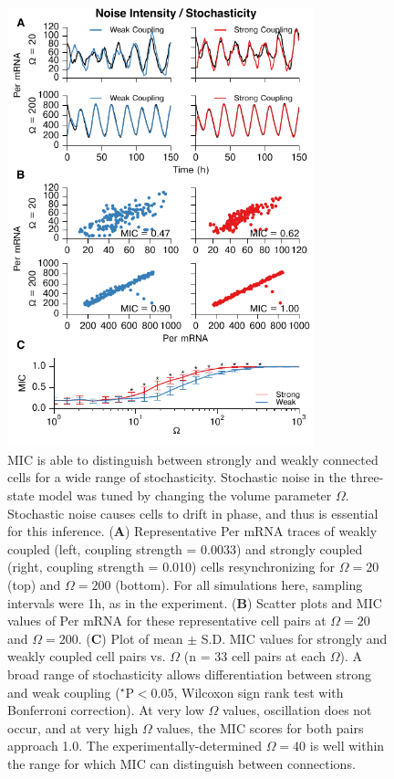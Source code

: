 \begin{figure}[p]
    \begin{center}
        \includegraphics[width=3.5in]{chap3/figures/s3.pdf}
    \end{center}
    \caption{\label{fig:s3} 
    MIC is able to distinguish between strongly and weakly connected cells for a wide range of stochasticity. Stochastic noise in the three-state model \cite{Schroder2012} was tuned by changing the volume parameter $\Omega$.
    Stochastic noise causes cells to drift in phase, and thus is essential for this inference.
    (\textbf{A}) Representative Per mRNA traces of weakly coupled (left, coupling strength = 0.0033) and strongly coupled (right, coupling strength = 0.010) cells resynchronizing for $\Omega=20$ (top) and $\Omega=200$ (bottom). For all simulations here, sampling intervals were 1h, as in the experiment.
    (\textbf{B}) Scatter plots and MIC values of Per mRNA for these representative cell pairs at $\Omega=20$ and $\Omega=200$.
    (\textbf{C}) Plot of mean $\pm$ S.D. MIC values for strongly and weakly coupled cell pairs vs. $\Omega$ (n = 33 cell pairs at each $\Omega$). A broad range of stochasticity allows differentiation between strong and weak coupling ($^\star$P$ < 0.05$, Wilcoxon sign rank test with Bonferroni correction).
    At very low $\Omega$ values, oscillation does not occur, and at very high $\Omega$ values, the MIC scores for both pairs approach 1.0. The experimentally-determined $\Omega = 40$ is well within the range for which MIC can distinguish between connections.
}
\end{figure}







